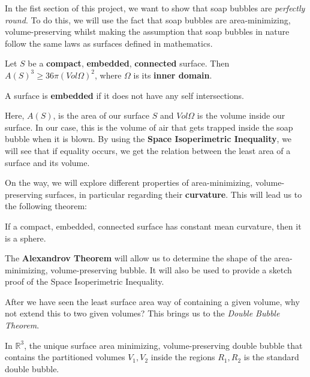 \documentclass[a4paper,12pt]{report}
\begin{document}
In the fist section of this project, we want to show that soap bubbles are \textit{perfectly round}. To do this, we will use the fact that soap bubbles are area-minimizing, volume-preserving whilst making the assumption that soap bubbles in nature follow the same laws as surfaces defined in mathematics.

\begin{theorem}
Let $S$ be a \textbf{compact}, \textbf{embedded}, \textbf{connected} surface. Then $A(S)^{3} \geq 36\pi(Vol\Omega)^{2}$, where $\Omega$ is its \textbf{inner domain}.
\end{theorem}

\begin{definition}
A surface is \textbf{embedded} if it does not have any self intersections. 
\end{definition}

Here, $A(S)$, is the area of our surface $S$ and $Vol\Omega$ is the volume inside our surface. In our case, this is the volume of air that gets trapped inside the soap bubble when it is blown. By using the \textbf{Space Isoperimetric Inequality}, we will see that if equality occurs, we get the relation between the least area of a surface and its volume.\par 
On the way, we will explore different properties of area-minimizing, volume-preserving surfaces, in particular regarding their \textbf{curvature}. This will lead us to the following theorem:

\begin{theorem}
If a compact, embedded, connected surface has constant mean curvature, then it is a sphere.
\end{theorem}

The \textbf{Alexandrov Theorem} will allow us to determine the shape of the area-minimizing, volume-preserving bubble. It will also be used to provide a sketch proof of the Space Isoperimetric Inequality. \newline

After we have seen the least surface area way of containing a given volume, why not extend this to two given volumes? This brings us to the \textit{Double Bubble Theorem}.

\begin{theorem}
In $\mathbb{R}^{3}$, the unique surface area minimizing, volume-preserving double bubble that contains the partitioned volumes $V_{1},V_{2}$ inside the regions $R_{1},R_{2}$ is the standard double bubble.
\end{theorem}
\end{document}
